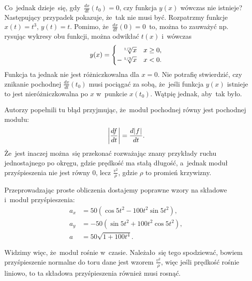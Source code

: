 \documentclass[a4paper,11pt]{article}
\numberwithin{equation}{section}
\begin{document}
Co~jednak dzieje~się, gdy~$\frac{ dx }{ dt }( t_{ 0 } ) = 0$, czy
funkcja $y( x )$ wówczas nie istnieje? Następujący przypadek pokazuje,
że~tak nie musi być. Rozpatrzmy funkcje $x( t ) = t^{ 3 }$,
$y( t ) = t$. Pomimo, że~$\frac{ dx }{ dt }( 0 ) = 0$~to, można to
zauważyć np. rysując wykresy obu funkcji, można odwikłać $t( x )$
i~wówczas
\begin{equation}
  \label{eq:KrysickiWlodarskiAnalizaVolI-01}
  y( x ) =
  \begin{cases}
    \hphantom{-}\sqrt[ 1 / 3 ]{ x } & x \geq 0, \\
    -\sqrt[ 1 / 3 ]{ x } & x < 0.
  \end{cases}
\end{equation}
Funkcja ta jednak nie jest różniczkowalna dla $x = 0$. Nie potrafię
stwierdzić, czy znikanie pochodnej $\frac{ dx }{ dt }( t_{ 0 } )$ musi
pociągać za sobą, że~jeśli funkcja $y( x )$ istnieje to jest
nieróżniczkowalna po $x$ w~punkcie $x( t_{ 0 } )$. Wątpię jednak,
aby~tak było.

\VerSpaceFour





\noindent
{} Autorzy popełnili tu błąd przyjmując, że~moduł
pochodnej równy jest pochodnej modułu:
\begin{equation*}
  \label{eq:KrysickiWlodarskiAnalizaVolI-02}
  \left| \frac{ df }{ dt } \right| =
  \frac{ d | \hspace{0.05em}  f  \hspace{0.05em} | }{ dt }.
\end{equation*}
Że~jest inaczej można~się przekonać rozważając znany przykłady ruchu
jednostajnego po okręgu, gdzie prędkość ma stałą długość, a~jednak
moduł przyśpieszenia nie jest równy 0, lecz $\frac{ v^{ 2 } }{ \rho }$,
gdzie $\rho$ to promień krzywizny.

Przeprowadzając proste obliczenia dostajemy poprawne wzory na składowe
i~moduł przyśpieszenia:
\begin{subequations}
  \begin{align}
    \label{eq:KrysickiWlodarskiAnalizaVolI-03-A}
    a_{ x } &= 50 ( \cos 5t^{ 2 } - 100 t^{ 2 } \sin 5t^{ 2 } ), \\
    \label{eq:KrysickiWlodarskiAnalizaVolI-03-B}
    a_{ y } &= -50 ( \sin 5t^{ 2 } + 100 t^{ 2 } \cos 5t^{ 2 } ), \\
    \label{eq:KrysickiWlodarskiAnalizaVolI-03-C}
    a &= 50 \sqrt{ 1 + 100 t^{ 4 } }.
  \end{align}
\end{subequations}

Widzimy więc, że~moduł rośnie w~czasie. Należało~się tego spodziewać,
bowiem przyśpieszenie normalne do toru dane jest wzorem
$\frac{ v^{ 2 } }{ \rho }$, więc jeśli prędkość rośnie liniowo, to ta
składowa przyśpieszenia również musi rosnąć.
\end{document}
